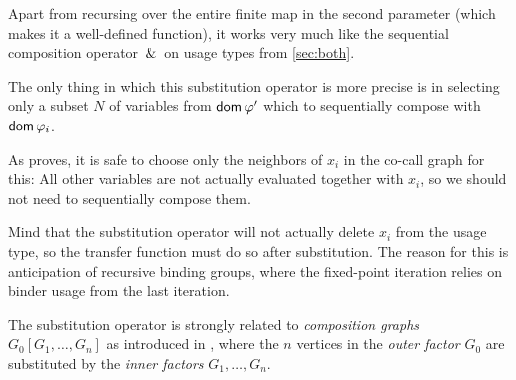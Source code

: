 
Apart from recursing over the entire finite map in the second parameter (which makes it a well-defined function), it works very much like the sequential composition operator $\,\&\,$ on usage types from \cref{sec:both}.

The only thing in which this substitution operator is more precise is in selecting only a subset $N$ of variables from $\mathsf{dom}\,\varphi'$ which to sequentially compose with $\mathsf{dom}\,\varphi_i$.

As \textcite{callarity} proves, it is safe to choose only the neighbors of $x_i$ in the co-call graph for this:
All other variables are not actually evaluated together with $x_i$, so we should not need to sequentially compose them.

Mind that the substitution operator will not actually delete $x_i$ from the usage type, so the transfer function must do so after substitution.
The reason for this is anticipation of recursive binding groups, where the fixed-point iteration relies on binder usage from the last iteration.

The substitution operator is strongly related to \emph{composition graphs} $G_0[G_1,\ldots,G_n]$ as introduced in \textcite[pp.~109]{agt}, where the $n$ vertices in the \emph{outer factor} $G_0$ are substituted by the \emph{inner factors} $G_1,\ldots,G_n$. 

